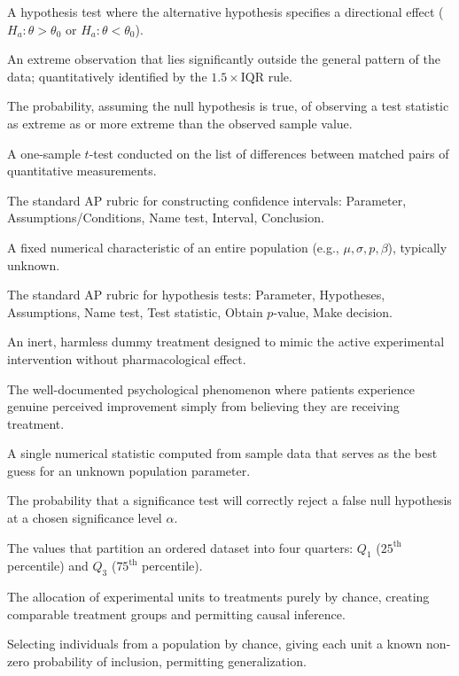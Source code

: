 \begin{description}[leftmargin=1.5em, style=nextline]
  \item[One-Sided Test] A hypothesis test where the alternative hypothesis specifies a directional effect ($H_a: \theta > \theta_0$ or $H_a: \theta < \theta_0$).
  \item[Outlier] An extreme observation that lies significantly outside the general pattern of the data; quantitatively identified by the $1.5 \times \text{IQR}$ rule.
  \item[$p$-Value] The probability, assuming the null hypothesis is true, of observing a test statistic as extreme as or more extreme than the observed sample value.
  \item[Paired $t$-Test] A one-sample $t$-test conducted on the list of differences between matched pairs of quantitative measurements.
  \item[PANIC Framework] The standard AP rubric for constructing confidence intervals: Parameter, Assumptions/Conditions, Name test, Interval, Conclusion.
  \item[Parameter] A fixed numerical characteristic of an entire population (e.g., $\mu, \sigma, p, \beta$), typically unknown.
  \item[PHANTOM Framework] The standard AP rubric for hypothesis tests: Parameter, Hypotheses, Assumptions, Name test, Test statistic, Obtain $p$-value, Make decision.
  \item[Placebo] An inert, harmless dummy treatment designed to mimic the active experimental intervention without pharmacological effect.
  \item[Placebo Effect] The well-documented psychological phenomenon where patients experience genuine perceived improvement simply from believing they are receiving treatment.
  \item[Point Estimate] A single numerical statistic computed from sample data that serves as the best guess for an unknown population parameter.
  \item[Power ($1 - \beta$)] The probability that a significance test will correctly reject a false null hypothesis at a chosen significance level $\alpha$.
  \item[Quartiles] The values that partition an ordered dataset into four quarters: $Q_1$ ($25^{\text{th}}$ percentile) and $Q_3$ ($75^{\text{th}}$ percentile).
  \item[Random Assignment] The allocation of experimental units to treatments purely by chance, creating comparable treatment groups and permitting causal inference.
  \item[Random Sampling] Selecting individuals from a population by chance, giving each unit a known non-zero probability of inclusion, permitting generalization.

\end{description}
